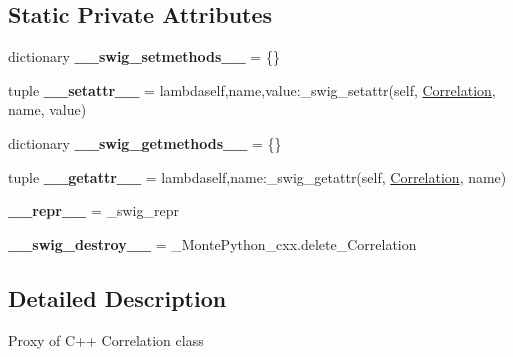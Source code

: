\subsection*{Static Private Attributes}
\begin{DoxyCompactItemize}
\item 
\hypertarget{classMontePython__cxx_1_1Correlation_ab7c6e3f139fa5e6ef7e4e256e8215009}{}dictionary {\bfseries \+\_\+\+\_\+swig\+\_\+setmethods\+\_\+\+\_\+} = \{\}\label{classMontePython__cxx_1_1Correlation_ab7c6e3f139fa5e6ef7e4e256e8215009}

\item 
\hypertarget{classMontePython__cxx_1_1Correlation_ace65695eb28b2191751afd09d203c377}{}tuple {\bfseries \+\_\+\+\_\+setattr\+\_\+\+\_\+} = lambdaself,name,value\+:\+\_\+swig\+\_\+setattr(self, \hyperlink{classMontePython__cxx_1_1Correlation}{Correlation}, name, value)\label{classMontePython__cxx_1_1Correlation_ace65695eb28b2191751afd09d203c377}

\item 
\hypertarget{classMontePython__cxx_1_1Correlation_a2c48587e7ea751d0f9ac3be2e8dc571b}{}dictionary {\bfseries \+\_\+\+\_\+swig\+\_\+getmethods\+\_\+\+\_\+} = \{\}\label{classMontePython__cxx_1_1Correlation_a2c48587e7ea751d0f9ac3be2e8dc571b}

\item 
\hypertarget{classMontePython__cxx_1_1Correlation_a4c4256508bce5a05cee26aad9971e6ea}{}tuple {\bfseries \+\_\+\+\_\+getattr\+\_\+\+\_\+} = lambdaself,name\+:\+\_\+swig\+\_\+getattr(self, \hyperlink{classMontePython__cxx_1_1Correlation}{Correlation}, name)\label{classMontePython__cxx_1_1Correlation_a4c4256508bce5a05cee26aad9971e6ea}

\item 
\hypertarget{classMontePython__cxx_1_1Correlation_a293c7ff649872a8aec72ce106086a7aa}{}{\bfseries \+\_\+\+\_\+repr\+\_\+\+\_\+} = \+\_\+swig\+\_\+repr\label{classMontePython__cxx_1_1Correlation_a293c7ff649872a8aec72ce106086a7aa}

\item 
\hypertarget{classMontePython__cxx_1_1Correlation_ae865672530d9d62b9017d712f720d1be}{}{\bfseries \+\_\+\+\_\+swig\+\_\+destroy\+\_\+\+\_\+} = \+\_\+\+Monte\+Python\+\_\+cxx.\+delete\+\_\+\+Correlation\label{classMontePython__cxx_1_1Correlation_ae865672530d9d62b9017d712f720d1be}

\end{DoxyCompactItemize}


\subsection{Detailed Description}
\begin{DoxyVerb}Proxy of C++ Correlation class\end{DoxyVerb}
 

